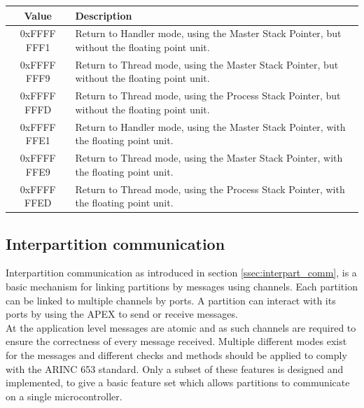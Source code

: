 \begin{table}[H]
	\centering
	\begin{tabular}{|c|p{10cm}|}
		\hline
		Value			&	Description 	\\
		\hline
		0xFFFF FFF1 	&	Return to Handler mode, using the Master Stack Pointer, but without the floating point unit.	\\
		\hline
		0xFFFF FFF9		&	Return to Thread mode, using the Master Stack Pointer, but without the floating point unit.		\\
		\hline
		0xFFFF FFFD		&	Return to Thread mode, using the Process Stack Pointer, but without the floating point unit.	\\
		\hline
		0xFFFF FFE1		&	Return to Handler mode, using the Master Stack Pointer, with the floating point unit.			\\
		\hline
		0xFFFF FFE9		&	Return to Thread mode, using the Master Stack Pointer, with the floating point unit.			\\
		\hline
		0xFFFF FFED		&	Return to Thread mode, using the Process Stack Pointer, with the floating point unit.			\\
		\hline
	\end{tabular}
	\label{tab:exc-return}
\end{table}


\subsection{Interpartition communication}
\label{design:interpart_comm}
Interpartition communication as introduced in section \ref{ssec:interpart_comm}, is a basic mechanism for linking partitions by messages using channels.
Each partition can be linked to multiple channels by ports.
A partition can interact with its ports by using the APEX to send or receive messages.\\

At the application level messages are atomic and as such channels are required to ensure the correctness of every message received\cite{arinc_interpartition_comm_atomic}.
Multiple different modes exist for the messages and different checks and methods should be applied to comply with the ARINC 653 standard.
Only a subset of these features is designed and implemented,
to give a basic feature set which allows partitions to communicate on a single microcontroller.\\

